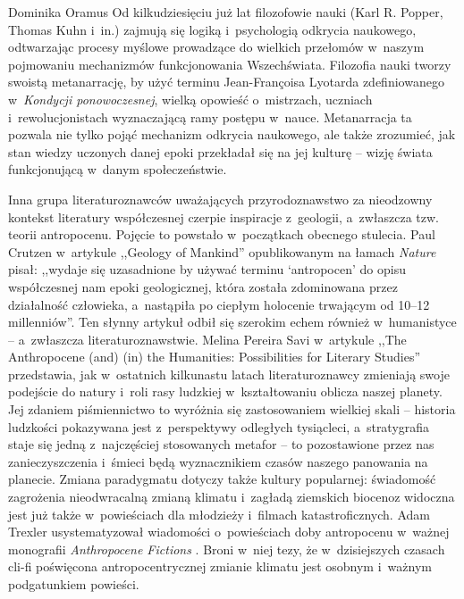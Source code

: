 \begin{artplenv}{Dominika Oramus}
Od kilkudziesięciu już lat filozofowie nauki (Karl R. Popper, Thomas Kuhn i~in.) zajmują się logiką i~psychologią odkrycia naukowego, odtwarzając procesy myślowe prowadzące do wielkich przełomów w~naszym pojmowaniu mechanizmów funkcjonowania Wszechświata. Filozofia nauki tworzy swoistą metanarrację, by użyć terminu Jean-Françoisa Lyotarda zdefiniowanego w~\textit{Kondycji ponowoczesnej}, wielką opowieść o~mistrzach, uczniach i~rewolucjonistach wyznaczającą ramy postępu w~nauce. Metanarracja ta pozwala nie tylko pojąć mechanizm odkrycia naukowego, ale także zrozumieć, jak stan wiedzy uczonych danej epoki przekładał się na jej kulturę -- wizję świata funkcjonującą w~danym społeczeństwie.

Inna grupa literaturoznawców uważających przyrodoznawstwo za nieodzowny kontekst literatury współczesnej czerpie inspiracje z~geologii, a~zwłaszcza tzw. teorii antropocenu. Pojęcie to powstało w~początkach obecnego stulecia. Paul Crutzen w~artykule ,,Geology of Mankind''
\parencite*[][]{crutzen_geology_2002} %
opublikowanym na łamach \textit{Nature} pisał: ,,wydaje się uzasadnione by używać terminu ‘antropocen’ do opisu współczesnej nam epoki geologicznej, która została zdominowana przez działalność człowieka, a~nastąpiła po ciepłym holocenie trwającym od 10–12 millenniów''. Ten słynny artykuł odbił się szerokim echem również w~humanistyce -- a~zwłaszcza literaturoznawstwie. Melina Pereira Savi w~artykule ,,The Anthropocene (and) (in) the Humanities: Possibilities for Literary Studies'' 
\parencite*[][]{savi_anthropocene_2017} %
 przedstawia, jak w~ostatnich kilkunastu latach literaturoznawcy zmieniają swoje podejście do natury i~roli rasy ludzkiej w~kształtowaniu oblicza naszej planety. Jej zdaniem piśmiennictwo to wyróżnia się zastosowaniem wielkiej skali -- historia ludzkości pokazywana jest z~perspektywy odległych tysiącleci, a~stratygrafia staje się jedną z~najczęściej stosowanych metafor -- to pozostawione przez nas zanieczyszczenia i~śmieci będą wyznacznikiem czasów naszego panowania na planecie. Zmiana paradygmatu dotyczy także kultury popularnej: świadomość zagrożenia nieodwracalną zmianą klimatu i~zagładą ziemskich biocenoz widoczna jest już także w~powieściach dla młodzieży i~filmach katastroficznych. Adam Trexler usystematyzował wiadomości o~powieściach doby antropocenu w~ważnej monografii \textit{Anthropocene Fictions} 
\parencite*[][]{trexler_anthropocene_2015}. %
 Broni w~niej tezy, że w~dzisiejszych czasach cli-fi poświęcona antropocentrycznej zmianie klimatu jest osobnym i~ważnym podgatunkiem powieści.


\end{artplenv}
